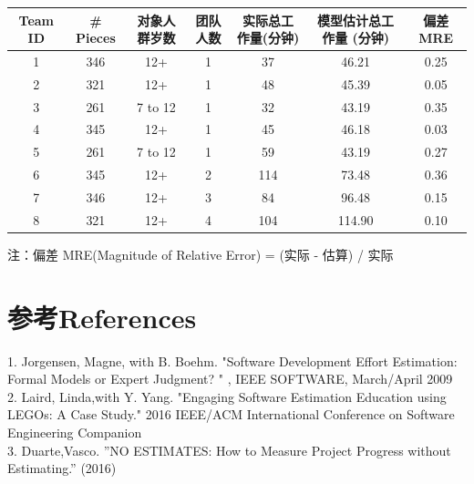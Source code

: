 
\begin{tabular}{|c|c|c|c|c|c|c|}
\hline
Team ID&\# Pieces&对象人群岁数&团队人数&实际总工作量(分钟)&模型估计总工作量 (分钟)&偏差 MRE \\
\hline
1&346&12+&1&37&46.21&0.25\\
\hline
2&321&12+&1&48&45.39&0.05\\
\hline
3&261&7 to 12&1&32&43.19&0.35\\
\hline
4&345&12+&1&45&46.18&0.03\\
\hline
5&261&7 to 12&1&59&43.19&0.27\\
\hline
6&345&12+&2&114&73.48&0.36\\
\hline
7&346&12+&3&84&96.48&0.15\\
\hline
8&321&12+&4&104&114.90&0.10\\
\hline
\end{tabular}


注：偏差 MRE(Magnitude of Relative Error) = \textbar{} (实际 - 估算)
\textbar{} / 实际

\hypertarget{references}{%
\section{参考References}\label{references}}

1. Jorgensen, Magne, with B. Boehm. "Software Development Effort Estimation: Formal Models or Expert Judgment? " , IEEE SOFTWARE, March/April 2009 \\
2. Laird, Linda,with Y. Yang. "Engaging Software Estimation Education using LEGOs: A Case Study." 2016 IEEE/ACM International Conference on Software Engineering Companion\\
3. Duarte,Vasco. ''NO ESTIMATES: How to Measure Project Progress without Estimating.'' (2016)\\


